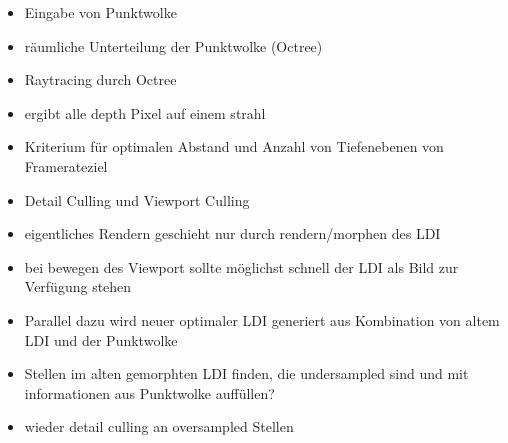 \documentclass[hyperref, beleg, german]{cgvpub}
\begin{document}
\begin{itemize}
	\item Eingabe von Punktwolke
	\item räumliche Unterteilung der Punktwolke (Octree)
	\item Raytracing durch Octree
	\item ergibt alle depth Pixel auf einem strahl
	\item Kriterium für optimalen Abstand und Anzahl von Tiefenebenen von Framerateziel
	\item Detail Culling und Viewport Culling
	\item eigentliches Rendern geschieht nur durch rendern/morphen des LDI
	\item bei bewegen des Viewport sollte möglichst schnell der LDI als Bild zur Verfügung stehen
	\item Parallel dazu wird neuer optimaler LDI generiert aus Kombination von altem LDI und der Punktwolke
	\item Stellen im alten gemorphten LDI finden, die undersampled sind und mit informationen aus Punktwolke auffüllen?
	\item wieder detail culling an oversampled Stellen
\end{itemize}
\end{document}
